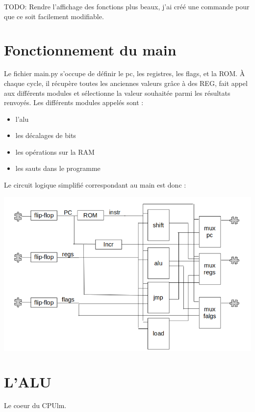 \documentclass[french, 12pt]{article}
\begin{document}
TODO: Rendre l'affichage des fonctions plus beaux, j'ai créé une commande pour que ce soit facilement modifiable.
\section*{Fonctionnement du main}

Le fichier main.py s'occupe de définir le pc, les registres, les flags, et la ROM. À chaque cycle, il récupère toutes les anciennes valeurs grâce à des REG, fait appel aux différents modules et sélectionne la valeur souhaitée parmi les résultats renvoyés. Les différents modules appelés sont :
\begin{itemize}
    \item l'alu
    \item les décalages de bits
    \item les opérations sur la RAM
    \item les sauts dans le programme
\end{itemize}

Le circuit logique simplifié correspondant au main est donc :

\includegraphics[width=17cm]{circuit_main.png}

\section*{L'ALU}

Le coeur du CPUlm. 
\end{document}
